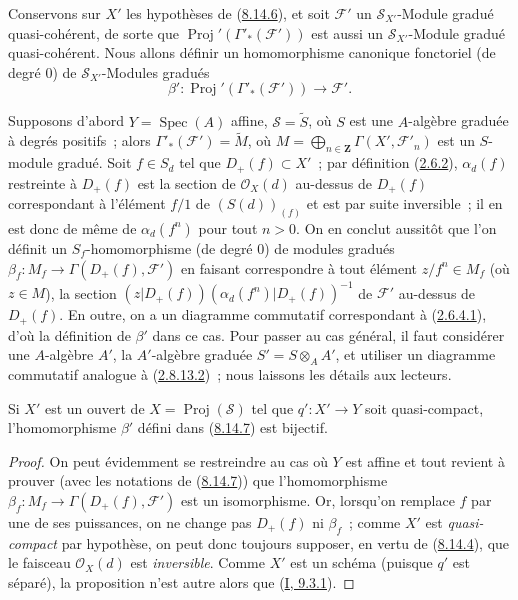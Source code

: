 \begin{env}[8.14.7]
\label{II.8.14.7-fr}
Conservons sur $X'$ les hypothèses de
(\hyperref[II.8.14.6-fr]{8.14.6}), et soit $\mathcal{F}'$ un
$\mathcal{S}_{X'}$-Module gradué quasi-cohérent, de sorte que
$\operatorname{Proj}'(\Gamma'_*(\mathcal{F}'))$ est aussi un
$\mathcal{S}_{X'}$-Module gradué quasi-cohérent. Nous allons définir un
homomorphisme canonique fonctoriel (de degré $0$) de
$\mathcal{S}_{X'}$-Modules gradués
\begin{equation}
\label{II.8.14.7.1-fr}
  \beta':\operatorname{Proj}'(\Gamma'_*(\mathcal{F}'))\to\mathcal{F}'.
\tag{8.14.7.1}
\end{equation}

Supposons d'abord $Y=\operatorname{Spec}(A)$ affine,
$\mathcal{S}=\widetilde{S}$, où $S$ est une $A$-algèbre graduée à degrés
positifs~; alors $\Gamma'_*(\mathcal{F}')=\widetilde{M}$, où
$M=\bigoplus_{n\in\mathbf{Z}}\Gamma(X',\mathcal{F}'_n)$ est un $S$-module
gradué. Soit $f\in S_d$ tel que $D_+(f)\subset X'$~; par définition
(\hyperref[II.2.6.2-fr]{2.6.2}), $\alpha_d(f)$ restreinte à $D_+(f)$ est la
section de $\mathcal{O}_X(d)$ au-dessus de $D_+(f)$ correspondant à
l'élément $f/1$ de $(S(d))_{(f)}$ et est par suite inversible~; il en est donc
de même de $\alpha_d(f^n)$ pour tout $n>0$. On en conclut aussitôt que
l'on définit un $S_f$-homomorphisme (de degré $0$) de modules gradués
$\beta_f:M_f\to\Gamma(D_+(f),\mathcal{F}')$ en faisant correspondre à tout
élément $z/f^n\in M_f$ (où $z\in M$), la section
$(z|D_+(f))(\alpha_d(f^n)|D_+(f))^{-1}$ de $\mathcal{F}'$ au-dessus de
$D_+(f)$. En outre, on a un diagramme commutatif correspondant à
(\hyperref[II.2.6.4.1-fr]{2.6.4.1}), d'où la définition de $\beta'$ dans ce
cas. Pour passer au cas général, il faut considérer une $A$-algèbre $A'$,
la $A'$-algèbre graduée $S'=S\otimes_A A'$, et utiliser un diagramme
commutatif analogue à (\hyperref[II.2.8.13.2-fr]{2.8.13.2})~; nous laissons
les détails aux lecteurs.
\end{env}

\begin{proposition}[8.14.8]
\label{II.8.14.8-fr}
Si $X'$ est un ouvert de $X=\operatorname{Proj}(\mathcal{S})$ tel que
$q':X'\to Y$ soit quasi-compact, l'homomorphisme $\beta'$ défini dans
(\hyperref[II.8.14.7-fr]{8.14.7}) est bijectif.
\end{proposition}

\begin{proof}
On peut évidemment se restreindre au cas où $Y$ est affine et tout revient à
prouver (avec les notations de (\hyperref[II.8.14.7-fr]{8.14.7})) que
l'homomorphisme $\beta_f:M_f\to\Gamma(D_+(f),\mathcal{F}')$ est un
isomorphisme. Or, lorsqu'on remplace $f$ par une de ses puissances, on ne
change pas $D_+(f)$ ni $\beta_f$~; comme $X'$ est \emph{quasi-compact} par
hypothèse, on peut donc toujours supposer, en vertu de
(\hyperref[II.8.14.4-fr]{8.14.4}), que le faisceau $\mathcal{O}_X(d)$ est
\emph{inversible}. Comme $X'$ est un schéma (puisque $q'$ est séparé), la
proposition n'est autre alors que (\hyperref[I.9.3.1-fr]{I, 9.3.1}).
\end{proof}

